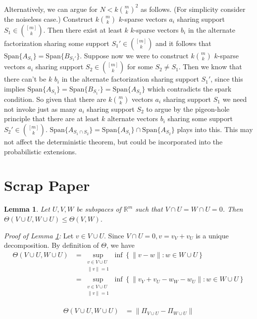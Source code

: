 \documentclass[journal,onecolumn]{IEEEtran}
\newtheorem{lemma}{Lemma}
\begin{document}
Alternatively, we can argue for $N < k {m \choose k}^2$ as follows. (For simplicity consider the noiseless case.) Construct $k {m \choose k}$ $k$-sparse vectors $a_i$ sharing support $S_1 \in {[m] \choose k}$. Then there exist at least $k$ $k$-sparse vectors $b_i$ in the alternate factorization sharing some support $S_1' \in {[m] \choose k}$ and it follows that $\text{Span}\{A_{S_1}\} = \text{Span}\{B_{S_1'}\}$. Suppose now we were to construct $k {m \choose k}$ $k$-sparse vectors $a_i$ sharing support $S_2 \in {[m] \choose k}$ for some $S_2 \neq S_1$. Then we know that there can't be $k$ $b_i$ in the alternate factorization sharing support $S_1'$, since this implies $\text{Span}\{A_{S_1}\} = \text{Span}\{B_{S_1'}\} = \text{Span}\{A_{S_2}\}$ which contradicts the spark condition. So given that there are $k{m \choose k}$ vectors $a_i$ sharing support $S_1$ we need not invoke just as many $a_i$ sharing support $S_2$ to argue by the pigeon-hole principle that there are at least $k$ alternate vectors $b_i$ sharing some support $S_2' \in {[m] \choose k}$. $\text{Span}\{A_{S_1 \cap S_2}\} = \text{Span}\{A_{S_1}\} \cap \text{Span}\{A_{S_2}\}$ plays into this. This may not affect the deterministic theorem, but could be incorporated into the probabilistic extensions.

\section{Scrap Paper}


\begin{lemma}\label{GapLemma1}
Let $U, V, W$ be subspaces of $\mathbb{R}^m$ such that $V \cap U = W \cap U = 0$. Then $\Theta(V \cup U, W \cup U) \leq \Theta(V,W)$. 
\end{lemma}

\emph{Proof of Lemma \ref{GapLemma1}:} Let $v \in V \cup U$. Since $V \cap U = 0, v = v_V + v_U$ is a unique decomposition. By definition of $\Theta$, we have
\begin{align}
\Theta(V \cup U, W \cup U) &= \sup_{\substack{ v \in V \cup U \\ \|v\|=1}} \inf \left\{ \|v - w\| : w \in W \cup U \right\} \\
&= \sup_{\substack{ v \in V \cup U \\ \|v\|=1}} \inf \left\{ \|v_V + v_U - w_W - w_U\| : w \in W \cup U \right\}
\end{align}

\begin{align}
\Theta(V \cup U, W \cup U) &= \| \Pi_{V \cup U} - \Pi_{W \cup U} \|
\end{align}
\end{document}
